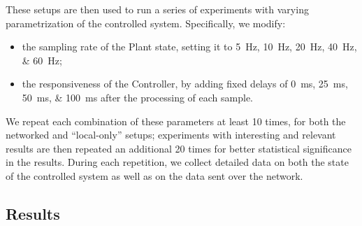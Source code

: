 These setups are then used to run a series of experiments with varying parametrization of the controlled system.
Specifically, we modify:
\begin{itemize}
    \item the sampling rate of the Plant state, setting it to \SIlist[list-units=single,list-final-separator={, or }]{5;10;20;40;60}{\hertz};
    \item the responsiveness of the Controller, by adding fixed delays of  \SIlist[list-units=single,list-final-separator={, or }]{0;25;50;100}{\milli\second} after the processing of each sample.
\end{itemize}
We repeat each combination of these parameters at least \num{10} times, for both the networked and ``local-only'' setups; experiments with interesting and relevant results are then repeated an additional \num{20} times for better statistical significance in the results.
During each repetition, we collect detailed data on both the state of the controlled system as well as on the data sent over the network.

\subsection{Results}\label{ssec:results}